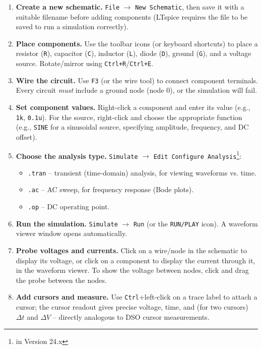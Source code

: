 \begin{enumerate}[label=\arabic*.]
	\item \textbf{Create a new schematic.} \texttt{File} $\rightarrow$ \texttt{New Schematic}, then save it with a suitable filename before adding components (LTspice requires the file to be saved to run a simulation correctly).
	\item \textbf{Place components.} Use the toolbar icons (or keyboard shortcuts) to place a resistor (\texttt{R}), capacitor (\texttt{C}), inductor (\texttt{L}), diode (\texttt{D}), ground (\texttt{G}), and a voltage source. Rotate/mirror using \texttt{Ctrl+R}/\texttt{Ctrl+E}.
	\item \textbf{Wire the circuit.} Use \texttt{F3} (or the wire tool) to connect component terminals. Every circuit \emph{must} include a ground node (node 0), or the simulation will fail.
	\item \textbf{Set component values.} Right-click a component and enter its value (e.g., \texttt{1k}, \texttt{0.1u}). For the source, right-click and choose the appropriate function (e.g., \texttt{SINE} for a sinusoidal source, specifying amplitude, frequency, and DC offset).
	\item \textbf{Choose the analysis type.} \texttt{Simulate} $\rightarrow$ \texttt{Edit Configure Analysis}\footnote{in Version 24.x}:
	\begin{itemize}
		\item \texttt{.tran} -- transient (time-domain) analysis, for viewing waveforms vs. time.
		\item \texttt{.ac} -- AC sweep, for frequency response (Bode plots).
		\item \texttt{.op} -- DC operating point.
	\end{itemize}
	\item \textbf{Run the simulation.} \texttt{Simulate} $\rightarrow$ \texttt{Run} (or the \texttt{RUN/PLAY} icon). A waveform viewer window opens automatically.
	\item \textbf{Probe voltages and currents.} Click on a wire/node in the schematic to display its voltage, or click on a component to display the current through it, in the waveform viewer. To show the voltage between nodes, click and drag the probe between the nodes.
	\item \textbf{Add cursors and measure.} Use \texttt{Ctrl}+left-click on a trace label to attach a cursor; the cursor readout gives precise voltage, time, and (for two cursors) $\Delta t$ and $\Delta V$ -- directly analogous to DSO cursor measurements.
\end{enumerate}


